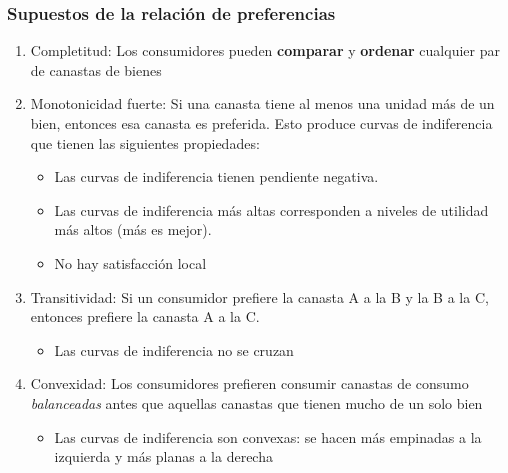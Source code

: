 \documentclass{beamer}
\begin{document}
\begin{frame}
\frametitle{Supuestos de la relación de preferencias}
\begin{enumerate}
\item Completitud: Los consumidores pueden \textbf{comparar} y \textbf{ordenar} cualquier par de canastas de bienes
\item Monotonicidad fuerte: Si una canasta tiene al menos una unidad más de un bien, entonces esa canasta es preferida. Esto produce curvas de indiferencia que tienen las siguientes propiedades:
    \begin{itemize}
        \item Las curvas de indiferencia tienen pendiente negativa. 
        \item Las curvas de indiferencia más altas corresponden a niveles de utilidad más altos (más es mejor).
        \item No hay satisfacción local
    \end{itemize}
\item Transitividad: Si un consumidor prefiere la canasta A a la B y la B a la C, entonces prefiere la canasta A a la C.
    \begin{itemize}
        \item Las curvas de indiferencia no se cruzan
    \end{itemize}
\item Convexidad: Los consumidores prefieren consumir canastas de consumo \textit{balanceadas} antes que aquellas canastas que tienen mucho de un solo bien
    \begin{itemize}
        \item Las curvas de indiferencia son convexas: se hacen más empinadas a la izquierda y más planas a la derecha 
    \end{itemize}
\end{enumerate} 
\end{frame}
\end{document}
